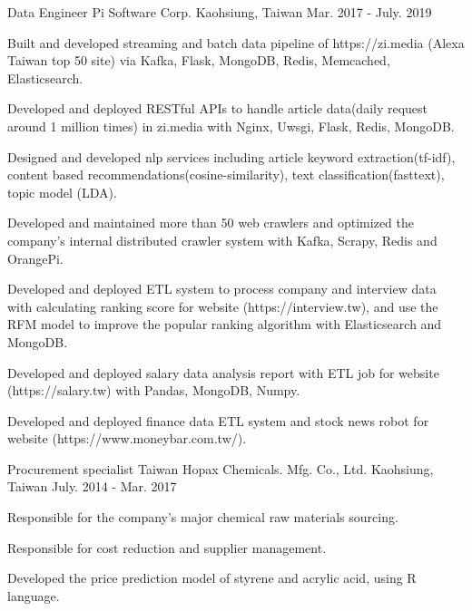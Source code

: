 \begin{cventries}
  \cventry
    {Data Engineer} %
    {Pi Software Corp.} %
    {Kaohsiung, Taiwan} %
    {Mar. 2017 - July. 2019} %
    {
      \begin{cvitems} %
        \item {Built and developed streaming and batch data pipeline of https://zi.media (Alexa Taiwan top 50 site) via Kafka, Flask, MongoDB, Redis, Memcached, Elasticsearch.}
        \item {Developed and deployed RESTful APIs to handle article data(daily request around 1 million times) in zi.media with Nginx, Uwsgi, Flask, Redis, MongoDB.}
        \item {Designed and developed nlp services including article keyword extraction(tf-idf), content based recommendations(cosine-similarity), text classification(fasttext), topic model (LDA).}
        \item {Developed and maintained more than 50 web crawlers and optimized the company’s internal distributed crawler system with Kafka, Scrapy, Redis and OrangePi.}
        \item {Developed and deployed ETL system to process company and interview data with calculating ranking score for website (https://interview.tw), and use the RFM model to improve the popular ranking algorithm with Elasticsearch and MongoDB.}
        \item {Developed and deployed salary data analysis report with ETL job for website (https://salary.tw) with Pandas, MongoDB, Numpy.}
        \item {Developed and deployed finance data ETL system and stock news robot for website (https://www.moneybar.com.tw/).}
      \end{cvitems}
    }

  \cventry
    {Procurement specialist} %
    {Taiwan Hopax Chemicals. Mfg. Co., Ltd.} %
    {Kaohsiung, Taiwan} %
    {July. 2014 - Mar. 2017} %
    {
      \begin{cvitems} %
        \item {Responsible for the company's major chemical raw materials sourcing.}
        \item {Responsible for cost reduction and supplier management.}
        \item {Developed the price prediction model of styrene and acrylic acid, using R language.}
      \end{cvitems}
    }


\end{cventries}
